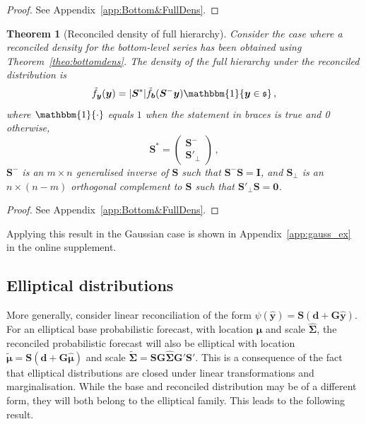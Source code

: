 \documentclass[a4paper,12pt]{article}
\newtheorem{theo}{Theorem}[section]
\theoremstyle{definition}
\begin{document}
\begin{proof}
	See Appendix~\ref{app:Bottom&FullDens}.
\end{proof}

\begin{theo}[Reconciled density of full hierarchy]\label{theo:fulldens}
	Consider the case where a reconciled density for the bottom-level series has been obtained using Theorem~\ref{theo:bottomdens}. The density of the full hierarchy under the reconciled distribution is
	\[
	\tilde{f}_{\bm{y}}(\bm{y}) =
	|\bm{S}^*| \tilde{f}_{\bm{b}}({\bm{S}^-\bm{y}})
	\mathbbm{1}\{\bm{y}\in\mathfrak{s}\}\,,
	\]
	where $\mathbbm{1}\{\cdot\}$ equals $1$ when the statement in braces is true and 0 otherwise,
	\[
	\bm{S}^*=\begin{pmatrix}
	\bm{S}^-\\
	\bm{S}'_\perp
	\end{pmatrix}\,,
	\]
	$\bm{S}^-$ is an $m\times n$ generalised inverse of $\bm{S}$ such that $\bm{S}^-\bm{S}=\bm{I}$,
	and $\bm{S}_\perp$ is an $n\times (n-m)$ orthogonal complement to $\bm{S}$ such that $\bm{S}'_\perp\bm{S}=\bm{0}$.
\end{theo}

\begin{proof}
	See Appendix~\ref{app:Bottom&FullDens}.
\end{proof}

Applying this result in the Gaussian case is shown in Appendix~\ref{app:gauss_ex} in the online supplement.

\subsection{Elliptical distributions}\label{sec:elliptical}

More generally, consider linear reconciliation of the form $\psi(\hat{\bm{y}})=\bm{S}(\bm{d}+\bm{G}\hat{\bm{y}})$. For an elliptical base probabilistic forecast, with location $\hat{\bm\mu}$ and scale $\hat{\bm\Sigma}$, the reconciled probabilistic forecast will also be elliptical with location $\tilde{\bm{\mu}}=\bm{S}(\bm{d}+\bm{G}\hat{\bm{\mu}})$ and scale $\tilde{\bm{\Sigma}}=\bm{S}\bm{G}\hat{\bm{\Sigma}}\bm{G}'\bm{S}'$. This is a consequence of the fact that elliptical distributions are closed under linear transformations and marginalisation. While the base and reconciled distribution may be of a different form, they will both belong to the elliptical family. This leads to the following result.
\end{document}
